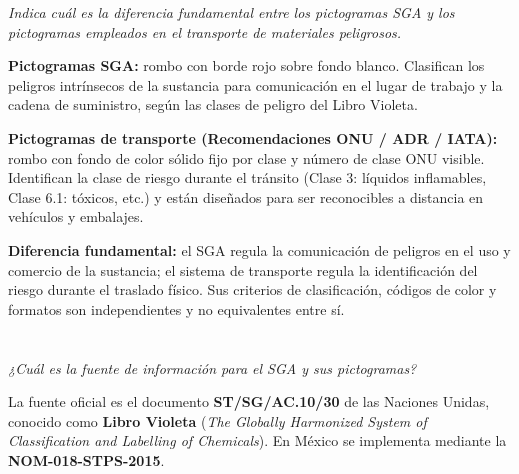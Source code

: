 \textit{Indica cuál es la diferencia fundamental entre los pictogramas SGA y los pictogramas empleados en el transporte de materiales peligrosos.}

\vspace{0.3cm}
\textbf{Pictogramas SGA:} rombo con borde rojo sobre fondo blanco. Clasifican los peligros intrínsecos de la sustancia para comunicación en el lugar de trabajo y la cadena de suministro, según las clases de peligro del Libro Violeta.

\textbf{Pictogramas de transporte (Recomendaciones ONU / ADR / IATA):} rombo con fondo de color sólido fijo por clase y número de clase ONU visible. Identifican la clase de riesgo durante el tránsito (Clase 3: líquidos inflamables, Clase 6.1: tóxicos, etc.) y están diseñados para ser reconocibles a distancia en vehículos y embalajes.

\textbf{Diferencia fundamental:} el SGA regula la comunicación de peligros en el uso y comercio de la sustancia; el sistema de transporte regula la identificación del riesgo durante el traslado físico. Sus criterios de clasificación, códigos de color y formatos son independientes y no equivalentes entre sí.


{}
\section*{\centering\fontsize{12}{18}}

\textit{¿Cuál es la fuente de información para el SGA y sus pictogramas?}

\vspace{0.3cm}
La fuente oficial es el documento \textbf{ST/SG/AC.10/30} de las Naciones Unidas, conocido como \textbf{Libro Violeta} (\textit{The Globally Harmonized System of Classification and Labelling of Chemicals}). En México se implementa mediante la \textbf{NOM-018-STPS-2015}.


{}
\section*{\centering\fontsize{12}{18}}

